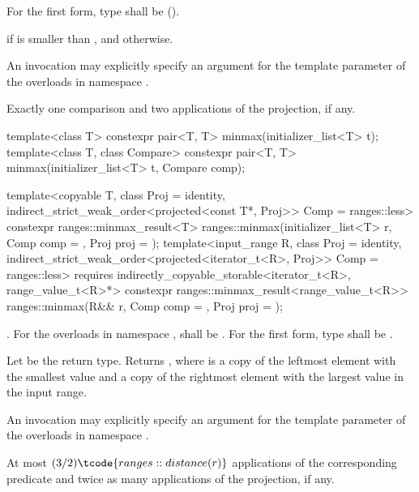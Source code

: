 \begin{itemdescr}
\pnum
\requires
For the first form, type  shall be
 ().

\pnum
\returns
{} if  is smaller than , and
 otherwise.

\pnum
\remarks
An invocation may explicitly specify
an argument for the template parameter 
of the overloads in namespace .

\pnum
\complexity
Exactly one comparison and two applications of the projection, if any.
\end{itemdescr}

%
\begin{itemdecl}
template<class T>
  constexpr pair<T, T> minmax(initializer_list<T> t);
template<class T, class Compare>
  constexpr pair<T, T> minmax(initializer_list<T> t, Compare comp);

template<copyable T, class Proj = identity,
         indirect_strict_weak_order<projected<const T*, Proj>> Comp = ranges::less>
  constexpr ranges::minmax_result<T>
    ranges::minmax(initializer_list<T> r, Comp comp = {}, Proj proj = {});
template<input_range R, class Proj = identity,
         indirect_strict_weak_order<projected<iterator_t<R>, Proj>> Comp = ranges::less>
  requires indirectly_copyable_storable<iterator_t<R>, range_value_t<R>*>
  constexpr ranges::minmax_result<range_value_t<R>>
    ranges::minmax(R&& r, Comp comp = {}, Proj proj = {});
\end{itemdecl}

\begin{itemdescr}
\pnum
\requires
{}.
For the overloads in namespace ,
 shall be .
For the first form, type  shall be .

\pnum
\returns
Let  be the return type.
Returns ,
where  is a copy of the leftmost element with the smallest value and
 a copy of the rightmost element with the largest value
in the input range.

\pnum
\remarks
An invocation may explicitly specify
an argument for the template parameter 
of the overloads in namespace .

\pnum
\complexity
At most $(3/2)\tcode{ranges::distance(r)}$ applications
of the corresponding predicate
and twice as many applications of the projection, if any.
\end{itemdescr}

